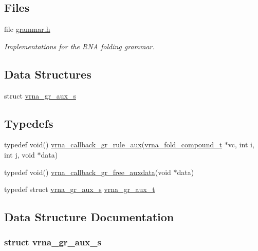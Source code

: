 \subsection*{Files}
\begin{DoxyCompactItemize}
\item 
file \mbox{\hyperlink{grammar_8h}{grammar.\+h}}
\begin{DoxyCompactList}\small\item\em Implementations for the R\+NA folding grammar. \end{DoxyCompactList}\end{DoxyCompactItemize}
\subsection*{Data Structures}
\begin{DoxyCompactItemize}
\item 
struct \mbox{\hyperlink{group__grammar_structvrna__gr__aux__s}{vrna\+\_\+gr\+\_\+aux\+\_\+s}}
\end{DoxyCompactItemize}
\subsection*{Typedefs}
\begin{DoxyCompactItemize}
\item 
typedef void() \mbox{\hyperlink{group__grammar_ga4872800fb64a0cc6d861f53efb91ee05}{vrna\+\_\+callback\+\_\+gr\+\_\+rule\+\_\+aux}}(\mbox{\hyperlink{group__fold__compound_ga1b0cef17fd40466cef5968eaeeff6166}{vrna\+\_\+fold\+\_\+compound\+\_\+t}} $\ast$vc, int i, int j, void $\ast$data)
\item 
typedef void() \mbox{\hyperlink{group__grammar_gadc8bec7146fda1ee9276df8fc22d8639}{vrna\+\_\+callback\+\_\+gr\+\_\+free\+\_\+auxdata}}(void $\ast$data)
\item 
typedef struct \mbox{\hyperlink{group__grammar_structvrna__gr__aux__s}{vrna\+\_\+gr\+\_\+aux\+\_\+s}} \mbox{\hyperlink{group__grammar_ga8825fbe6d7de2ff61c232cc7550a82cc}{vrna\+\_\+gr\+\_\+aux\+\_\+t}}
\end{DoxyCompactItemize}


\subsection{Data Structure Documentation}
\label{structvrna__gr__aux__s}
\subsubsection{struct vrna\+\_\+gr\+\_\+aux\+\_\+s}
